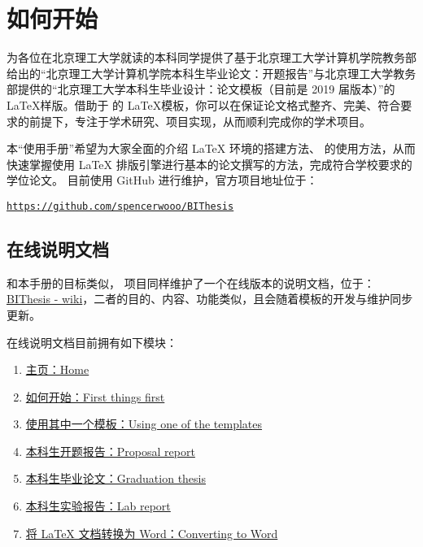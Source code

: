 \section{如何开始}
{\BIThesis} 为各位在北京理工大学就读的本科同学提供了基于北京理工大学计算机学院教务部给出的“北京理工大学计算机学院本科生毕业论文：开题报告”与北京理工大学教务部提供的“北京理工大学本科生毕业设计：论文模板（目前是 2019 届版本）”的 \LaTeX 样版。借助于 {\BIThesis} 的 \LaTeX 模板，你可以在保证论文格式整齐、完美、符合要求的前提下，专注于学术研究、项目实现，从而顺利完成你的学术项目。

本“使用手册”希望为大家全面的介绍 {\LaTeX} 环境的搭建方法、{\BIThesis} 的使用方法，从而快速掌握使用 {\LaTeX} 排版引擎进行基本的论文撰写的方法，完成符合学校要求的学位论文。{\BIThesis} 目前使用 GitHub 进行维护，官方项目地址位于：

\begin{center}
\color{ForestGreen}\href{https://github.com/spencerwooo/BIThesis}{\texttt{https://github.com/spencerwooo/BIThesis}}
\end{center}

\subsection{{\BIThesis} 在线说明文档}
和本手册的目标类似，{\BIThesis} 项目同样维护了一个在线版本的说明文档，位于：{\href{https://github.com/spencerwooo/BIThesis/wiki}{BIThesis - wiki}}，二者的目的、内容、功能类似，且会随着模板的开发与维护同步更新。

{\BIThesis} 在线说明文档目前拥有如下模块：

\begin{enumerate}
\item \href{https://github.com/spencerwooo/BIThesis/wiki}{主页：Home}
\item \href{https://github.com/spencerwooo/BIThesis/wiki/First-things-first}{如何开始：First things first }
\item \href{https://github.com/spencerwooo/BIThesis/wiki/Using-one-of-the-templates}{使用其中一个模板：Using one of the templates}
\item \href{https://github.com/spencerwooo/BIThesis/wiki/Proposal-Report}{本科生开题报告：Proposal report}
\item \href{https://github.com/spencerwooo/BIThesis/wiki/Final-Graduation-Thesis}{本科生毕业论文：Graduation thesis}
\item \href{https://github.com/spencerwooo/BIThesis/wiki/Lab-Report}{本科生实验报告：Lab report}
\item \href{https://github.com/spencerwooo/BIThesis/wiki/Converting-to-Word}{将 LaTeX 文档转换为 Word：Converting to Word}
\end{enumerate}

